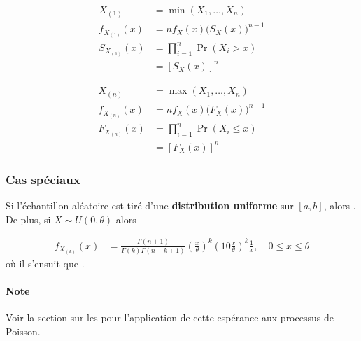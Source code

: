 \documentclass[french]{article}
\begin{document}
\begin{multicols*}{2}
\setlength{\mathindent}{-0.75cm}
\begin{minipage}{0.5\columnwidth}
\begin{definitionNOHFILL}[Minimum]
\begin{align*}
	X_{(1)}
	&=	\min(X_{1}, \dots, X_{n})	\\
	f_{X_{(1)}}(x)
	&=	n f_{X}(x) \big( S_{X}(x) \big)^{n - 1}	\\
	S_{X_{(1)}}(x)
	&=	\prod_{i = 1}^{n} \Pr(X_{i} > x)	\\
	&=	\left[S_{X}(x)\right]^{n}
\end{align*}
\end{definitionNOHFILL}
\end{minipage}%
\begin{minipage}{0.5\columnwidth}
\begin{definitionNOHFILL}[Maximum]
\begin{align*}
	X_{(n)}
	&=	\max(X_{1}, \dots, X_{n})	\\
	f_{X_{(n)}}(x)
	&=	n f_{X}(x) \big( F_{X}(x) \big)^{n - 1}	\\
	F_{X_{(n)}}(x)
	&=	\prod_{i = 1}^{n} \Pr(X_{i} \le x)	\\
	&=	\left[F_{X}(x)\right]^{n}
\end{align*}
\end{definitionNOHFILL}
\end{minipage}
\setlength{\mathindent}{1cm}


\subsubsection{Cas spéciaux}\label{subsubsec:orderStatsSpecialCases}
Si l'échantillon aléatoire est tiré d'une \textbf{distribution uniforme} sur $[a, b]$, alors . De plus, si $X \sim U(0, \theta)$ alors 

\begin{align*}
	f_{X_{(k)}}(x)
	&=	\frac{\Gamma(n + 1)}{\Gamma(k)\Gamma(n - k + 1)} \left(\frac{x}{\theta}\right)^{k}\left(1 0 \frac{x}{\theta}\right)^{k} \frac{1}{x}, \quad 0 \leq x \leq \theta
\end{align*}
où il s'ensuit que .

\paragraph{Note}	Voir la section sur les \textit{\underline{}} pour l'application de cette espérance aux processus de Poisson.



\end{multicols*}
\end{document}
